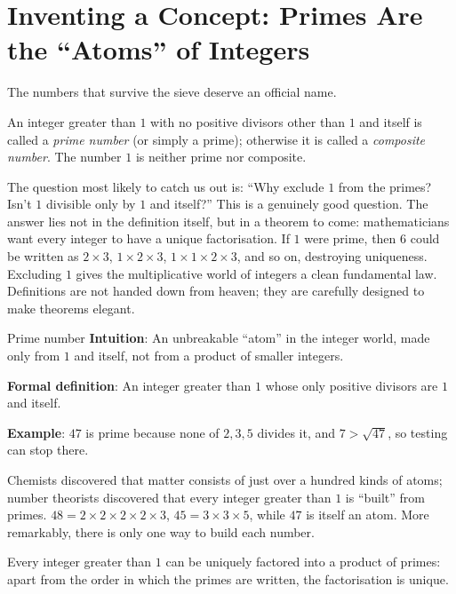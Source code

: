 \section{Inventing a Concept: Primes Are the ``Atoms'' of Integers}

The numbers that survive the sieve deserve an official name.

\begin{dingyi}
An integer greater than $1$ with no positive divisors other than $1$ and itself is called a \emph{prime number} (or simply a prime); otherwise it is called a \emph{composite number}. The number $1$ is neither prime nor composite.
\end{dingyi}

The question most likely to catch us out is: ``Why exclude $1$ from the primes? Isn't $1$ divisible only by $1$ and itself?'' This is a genuinely good question. The answer lies not in the definition itself, but in a theorem to come: mathematicians want every integer to have a unique factorisation. If $1$ were prime, then $6$ could be written as $2\times3$, $1\times2\times3$, $1\times1\times2\times3$, and so on, destroying uniqueness. Excluding $1$ gives the multiplicative world of integers a clean fundamental law. Definitions are not handed down from heaven; they are carefully designed to make theorems elegant.

\begin{shuyu}{Prime number}
\textbf{Intuition}: An unbreakable ``atom'' in the integer world, made only from $1$ and itself, not from a product of smaller integers.

\textbf{Formal definition}: An integer greater than $1$ whose only positive divisors are $1$ and itself.

\textbf{Example}: $47$ is prime because none of $2,3,5$ divides it, and $7>\sqrt{47}$, so testing can stop there.
\end{shuyu}

Chemists discovered that matter consists of just over a hundred kinds of atoms; number theorists discovered that every integer greater than $1$ is ``built'' from primes. $48=2\times2\times2\times2\times3$, $45=3\times3\times5$, while $47$ is itself an atom. More remarkably, there is only one way to build each number.

\begin{dingli}
Every integer greater than $1$ can be uniquely factored into a product of primes: apart from the order in which the primes are written, the factorisation is unique.
\end{dingli}

